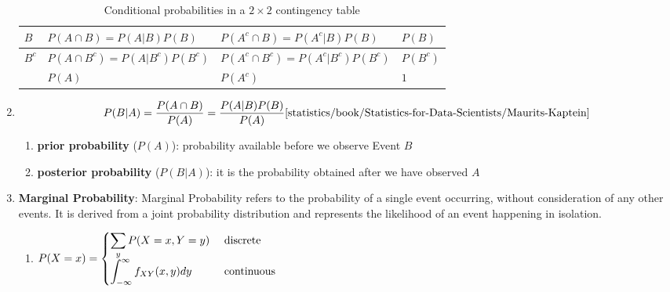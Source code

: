 \begin{enumerate}
\begin{customArrayStretch}{1.2}
\begin{table}[H]
\begin{tabular}{|l||l|l|l|}
                  $B$ & $P (A \cap B) = P (A|B) P (B)$ & $P (A^c \cap B) = P (A^c|B) P (B)$ & $P (B)$ \\
                  \hline

                  $B^c$ & $P (A \cap B^c) = P (A|B^c) P (B^c)$ & $P (A^c \cap B^c) = P (A^c|B^c) P (B^c)$ & $P (B^c)$ \\
                  \hline

                  & $P (A)$ & $P (A^c)$ & $1$ \\
                  \hline
            \end{tabular}
            \caption{Conditional probabilities in a $2 \times 2$ contingency table \cite{statistics/book/Statistics-for-Data-Scientists/Maurits-Kaptein}}
            \label{statistics/probability-theory/Conditional Probability/Conditional-probabilities-contingency-table}
        \end{table}
    \end{customArrayStretch}

    \item
    \begin{theorem}
        \[
            P(B|A)
            = \dfrac{P(A\cap B)}{P(A)} = \dfrac{P(A|B) P(B)}{P(A)}
            \text{\cite{statistics/book/Statistics-for-Data-Scientists/Maurits-Kaptein}}
        \]
    \end{theorem}
    \begin{enumerate}
        \item \textbf{prior probability} ($P(A)$): probability available before we observe Event $B$
        \hfill \cite{ml/book/Pattern-Recognition-And-Machine-Learning/Christopher-M-Bishop}

        \item \textbf{posterior probability} ($P(B|A)$): it is the probability obtained after we have observed $A$
        \hfill \cite{ml/book/Pattern-Recognition-And-Machine-Learning/Christopher-M-Bishop}
    \end{enumerate}

    \item \textbf{Marginal Probability}: Marginal Probability refers to the probability of a single event occurring, without consideration of any other events.
    It is derived from a joint probability distribution and represents the likelihood of an event happening in isolation.
    \hfill \cite{geeksforgeeks/engineering-mathematics/marginal-probability}
    \begin{enumerate}
        \item
        $
            P(X=x) =
            \begin{cases}
                \displaystyle\sum_y P(X=x, Y=y) & \text{ discrete} \\[0.2cm]
                \displaystyle\int_{-\infty}^\infty f_{XY}(x,y)dy & \text{ continuous} \\
            \end{cases}
        $
        \hfill \cite{geeksforgeeks/engineering-mathematics/marginal-probability}


\end{enumerate}
\end{enumerate}
